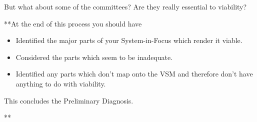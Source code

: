 But what about some of the committees? Are they really essential to viability?

**At the end of this process you should have

\begin{itemize}
  \item Identified the major parts of your System-in-Focus which render it viable.

  \item Considered the parts which seem to be inadequate.

  \item Identified any parts which don't map onto the VSM and therefore don't have anything to do with viability.

\end{itemize}

This concludes the Preliminary Diagnosis.

**
